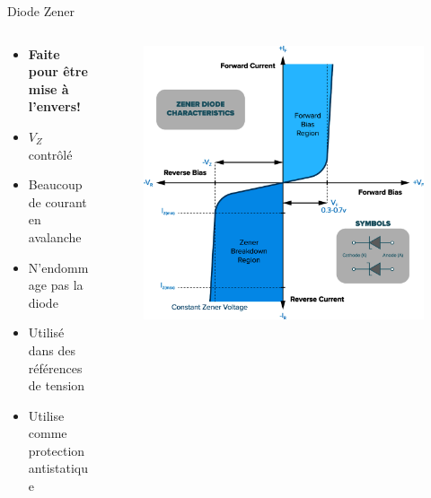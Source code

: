 \begin{frame}{Diode Zener}
    \begin{columns}
        \begin{column}{0.4\textwidth}
            \begin{itemize}
                \item \textbf{Faite pour être mise à l'envers!}
                \bigskip
                \item $V_Z$ contrôlé
                \item Beaucoup de courant en avalanche
                \item N'endommage pas la diode
                \bigskip
                \item Utilisé dans des références de tension
                \item Utilise comme protection antistatique
            \end{itemize}
        \end{column}
        \begin{column}{0.6\textwidth}
            \begin{figure}
                \centering
                \includegraphics[width=\textwidth]{pictures/diode-zener-iv-curve.png}
            \end{figure}
        \end{column}
    \end{columns}
\end{frame}

